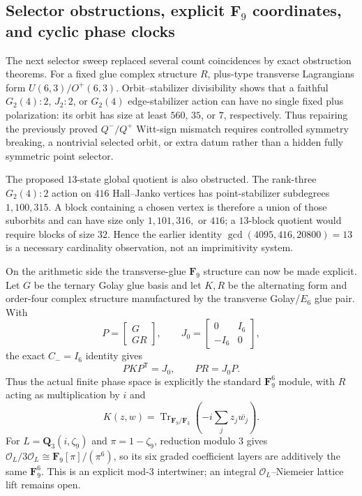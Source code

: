 
\subsection{Selector obstructions, explicit $\mathbf F_9$ coordinates, and cyclic phase clocks}
\label{sec:pass9885-9980-frontier}

The next selector sweep replaced several count coincidences by exact obstruction
theorems.  For a fixed glue complex structure $R$, plus-type transverse
Lagrangians form $U(6,3)/O^+(6,3)$.  Orbit--stabilizer divisibility shows that a
faithful $G_2(4){:}2$, $J_2{:}2$, or $G_2(4)$ edge-stabilizer action can have no
single fixed plus polarization: its orbit has size at least $560$, $35$, or $7$,
respectively.  Thus repairing the previously proved $Q^-/Q^+$ Witt-sign mismatch
requires controlled symmetry breaking, a nontrivial selected orbit, or extra
datum rather than a hidden fully symmetric point selector.

The proposed $13$-state global quotient is also obstructed.  The rank-three
$G_2(4){:}2$ action on $416$ Hall--Janko vertices has point-stabilizer subdegrees
$1,100,315$.  A block containing a chosen vertex is therefore a union of those
suborbits and can have size only $1,101,316,$ or $416$; a $13$-block quotient
would require blocks of size $32$.  Hence the earlier identity
$\gcd(4095,416,20800)=13$ is a necessary cardinality observation, not an
imprimitivity system.

On the arithmetic side the transverse-glue $\mathbf F_9$ structure can now be
made explicit.  Let $G$ be the ternary Golay glue basis and let $K,R$ be the
alternating form and order-four complex structure manufactured by the transverse
Golay/$E_6$ glue pair.  With
\[
 P=\begin{bmatrix}G\\GR\end{bmatrix},\qquad
 J_0=\begin{bmatrix}0&I_6\\-I_6&0\end{bmatrix},
\]
the exact $C_-=I_6$ identity gives
\[
 P K P^{\mathsf T}=J_0,\qquad P R=J_0P.
\]
Thus the actual finite phase space is explicitly the standard
$\mathbf F_9^6$ module, with $R$ acting as multiplication by $i$ and
\[
 K(z,w)=\operatorname{Tr}_{\mathbf F_9/\mathbf F_3}
 \!\left(-i\sum_j z_j\overline{w_j}\right).
\]
For $L=\mathbf Q_3(i,\zeta_9)$ and $\pi=1-\zeta_9$, reduction modulo $3$ gives
$\mathcal O_L/3\mathcal O_L\cong\mathbf F_9[\pi]/(\pi^6)$, so its six graded
coefficient layers are additively the same $\mathbf F_9^6$.  This is an explicit
mod-$3$ intertwiner; an integral $\mathcal O_L$--Niemeier lattice lift remains
open.

